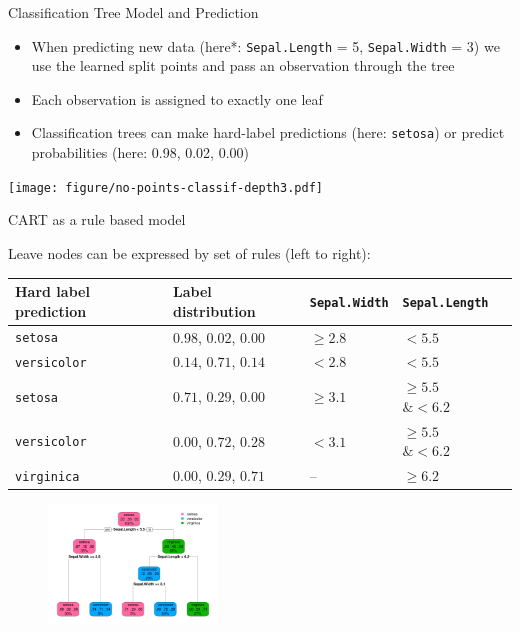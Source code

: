 \documentclass[11pt,compress,t,notes=noshow, xcolor=table]{beamer}
\begin{document}
\begin{vbframe}{Classification Tree Model and Prediction}
\begin{itemize}
\item When predicting new data (here*: \texttt{Sepal.Length} = 5, \texttt{Sepal.Width} = 3) we use the learned split points and pass an observation through the tree
\item Each observation is assigned to exactly one leaf
\item Classification trees can make hard-label predictions (here: \texttt{setosa}) or predict probabilities (here: 0.98, 0.02, 0.00)
\end{itemize}

\color{fgcolor}
{\centering \texttt{[image: figure/no-points-classif-depth3.pdf]}

}
\end{vbframe}

\begin{vbframe}{CART as a rule based model}

Leave nodes can be expressed by set of rules (left to right):

\begin{table}[]
\begin{tabular}{lllll}
Hard label prediction &  Label distribution & \texttt{Sepal.Width} & \texttt{Sepal.Length} \\
\hline
\texttt{setosa} & $0.98$, $0.02$, $0.00$ & $\geq 2.8$ & $< 5.5$ \\
\texttt{versicolor} & $0.14$, $0.71$, $0.14$ & $<2.8$ & $< 5.5$ \\
\texttt{setosa} & $0.71$, $0.29$, $0.00$ & $\geq 3.1$ & $\geq 5.5$ $\& < 6.2$ \\
\texttt{versicolor} & $0.00$, $0.72$, $0.28$ & $< 3.1$ & $\geq 5.5$ $\& < 6.2$\\
\texttt{virginica} & $0.00$, $0.29$, $0.71$ &  -- & $\geq 6.2$ \\

\end{tabular}
\end{table}

\begin{figure} 
\includegraphics[width=0.4\textwidth, keepaspectratio]{figure_man/tree_depth3_structure_wide.png}
\end{figure}


\end{vbframe}
\end{document}
